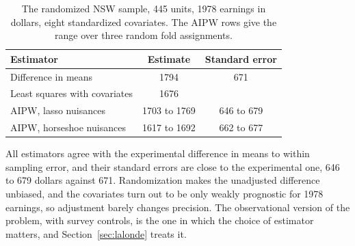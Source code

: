 \begin{table}[ht]
\centering
\caption{The randomized NSW sample, 445 units, 1978 earnings in dollars, eight standardized covariates. The AIPW rows give the range over three random fold assignments.}
\label{tab:baipwlalonde}
\small
\begin{tabular}{lcc}
\toprule
Estimator & Estimate & Standard error \\
\midrule
Difference in means & 1794 & 671 \\
Least squares with covariates & 1676 & \\
AIPW, lasso nuisances & 1703 to 1769 & 646 to 679 \\
AIPW, horseshoe nuisances & 1617 to 1692 & 662 to 677 \\
\bottomrule
\end{tabular}
\end{table}

All estimators agree with the experimental difference in means to within sampling error, and their standard errors are close to the experimental one, 646 to 679 dollars against 671. Randomization makes the unadjusted difference unbiased, and the covariates turn out to be only weakly prognostic for 1978 earnings, so adjustment barely changes precision. The observational version of the problem, with survey controls, is the one in which the choice of estimator matters, and Section~\ref{sec:lalonde} treats it.
